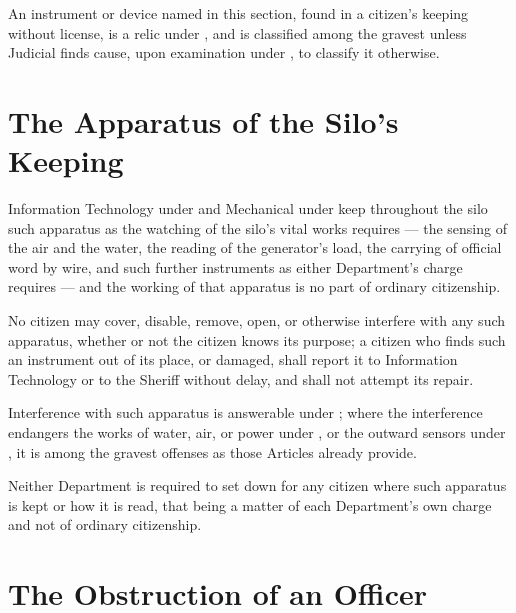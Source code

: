 \begin{clauses}
\item An instrument or device named in this section, found in a citizen's keeping without license, is a relic under , and is classified among the gravest unless Judicial finds cause, upon examination under , to classify it otherwise.
\end{clauses}

\section{The Apparatus of the Silo's Keeping}
\label{sec:publicorder:apparatus-of-the-silos-keeping}

Information Technology under  and Mechanical under  keep throughout the silo such apparatus as the watching of the silo's vital works requires --- the sensing of the air and the water, the reading of the generator's load, the carrying of official word by wire, and such further instruments as either Department's charge requires --- and the working of that apparatus is no part of ordinary citizenship.

\begin{clauses}
\item No citizen may cover, disable, remove, open, or otherwise interfere with any such apparatus, whether or not the citizen knows its purpose; a citizen who finds such an instrument out of its place, or damaged, shall report it to Information Technology or to the Sheriff without delay, and shall not attempt its repair.
\item Interference with such apparatus is answerable under ; where the interference endangers the works of water, air, or power under , or the outward sensors under , it is among the gravest offenses as those Articles already provide.
\item Neither Department is required to set down for any citizen where such apparatus is kept or how it is read, that being a matter of each Department's own charge and not of ordinary citizenship.
\end{clauses}

\section{The Obstruction of an Officer}
\label{sec:publicorder:obstruction-of-an-officer}

